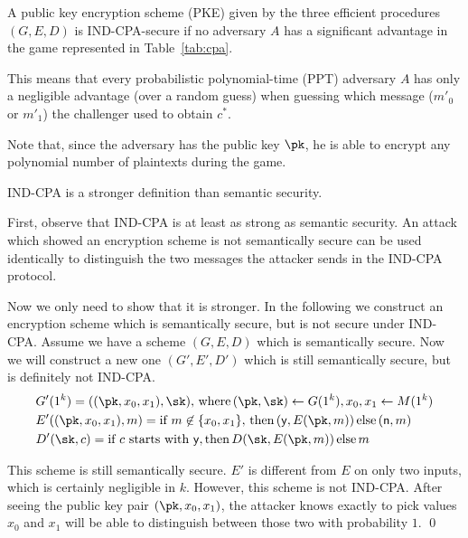 \begin{definition}
    A public key encryption scheme (PKE) given by the three efficient procedures $(G,E,D)$ is
    IND-CPA-secure if no adversary $A$ has a significant advantage in the game
    represented in Table~\ref{tab:cpa}.

    This means that every probabilistic polynomial-time (PPT) adversary $A$ has only a
    negligible advantage (over a random guess)
    when guessing which message ($m'_0$ or $m'_1$) the challenger used to
    obtain $c^*$.

    Note that, since the adversary has the public key $\pk$, he is able to encrypt any
    polynomial number of plaintexts during the game.
\end{definition}


\begin{theorem}
    IND-CPA is a stronger definition than semantic security.
\end{theorem}

\proof
First, observe that IND-CPA is at least as strong as semantic security. An
attack which showed an encryption scheme is not semantically secure can be used
identically to distinguish the two messages the attacker sends in the IND-CPA protocol.

Now we only need to show that it is stronger.
In the following we construct an encryption scheme which is semantically secure, but is not secure
under IND-CPA.
Assume we have
a scheme $(G, E, D)$ which is semantically secure. Now we will construct a new one
$(G', E', D')$ which  is still semantically secure, but is definitely not IND-CPA.
\begin{align*}
     & G'(1^k) = ((\pk, x_0, x_1), \sk), \,\text{where}\, (\pk,\sk) \gets G(1^k), x_0, x_1 \gets M(1^k)                               \\
     & E'((\pk, x_0, x_1), m) = \text{if } m \not\in\{x_0,x_1\}, \,\text{then}\, (\mathsf{y},E(\pk,m)) \,\text{else}\, (\mathsf{n},m) \\
     & D'(\sk, c) = \text{if } c \text{ starts with } \mathsf{y}, \text{then}\, D(\sk,E(\pk,m)) \,\text{else}\, m
\end{align*}

This scheme is still semantically secure. $E'$ is different from $E$ on only two
inputs, which is certainly negligible in $k$. However, this
scheme is not IND-CPA. After seeing the public key pair $(\pk, x_0, x_1)$, the attacker
knows exactly to pick values $x_0$ and $x_1$ will be able to distinguish between
those two with probability $1$. \qed


